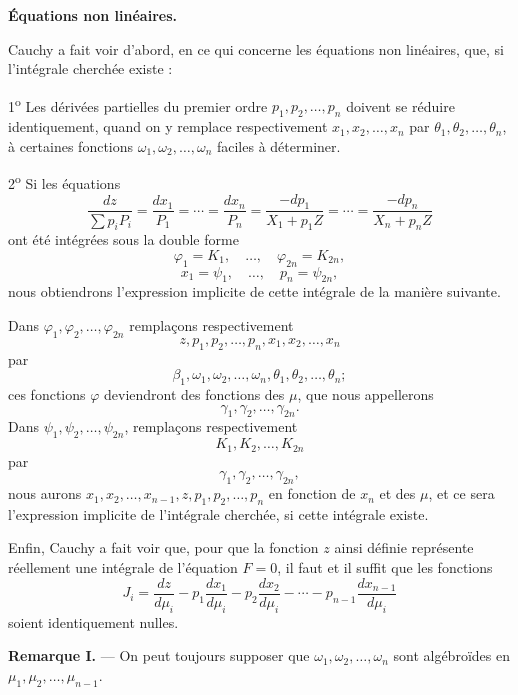 \documentclass[11pt]{article}
\begin{document}
\begin{center}
\textbf{Équations non linéaires.}
\end{center}

Cauchy a fait voir d'abord, en ce qui concerne les équations non linéaires, que, si l'intégrale cherchée existe :

1\textsuperscript{o} Les dérivées partielles du premier ordre $p_1,p_2,\ldots,p_n$ doivent se réduire identiquement, quand on y remplace respectivement $x_1,x_2,\ldots,x_n$ par $\theta_1,\theta_2,\ldots,\theta_n$, à certaines fonctions $\omega_1,\omega_2,\ldots,\omega_n$ faciles à déterminer.

2\textsuperscript{o} Si les équations
\begin{equation*}\tag{4}
\frac{dz}{\sum p_iP_i}=\frac{dx_1}{P_1}=\cdots=\frac{dx_n}{P_n}=\frac{-dp_1}{X_1+p_1Z}=\cdots=\frac{-dp_n}{X_n+p_nZ}
\end{equation*}
ont été intégrées sous la double forme
\begin{equation*}\tag{5}
\varphi_1=K_1,
\quad \ldots,
\quad \varphi_{2n}=K_{2n},
\end{equation*}
\begin{equation*}\tag{6}
x_1=\psi_1,
\quad \ldots,
\quad p_n=\psi_{2n},
\end{equation*}
nous obtiendrons l'expression implicite de cette intégrale de la manière suivante.

Dans $\varphi_1,\varphi_2,\ldots,\varphi_{2n}$ remplaçons respectivement
\[
z,p_1,p_2,\ldots,p_n,x_1,x_2,\ldots,x_n
\]
par
\[
\beta_1,\omega_1,\omega_2,\ldots,\omega_n,\theta_1,\theta_2,\ldots,\theta_n;
\]
ces fonctions $\varphi$ deviendront des fonctions des $\mu$, que nous appellerons
\[
\gamma_1,\gamma_2,\ldots,\gamma_{2n}.
\]
Dans $\psi_1,\psi_2,\ldots,\psi_{2n}$, remplaçons respectivement
\[
K_1,K_2,\ldots,K_{2n}
\]
par
\[
\gamma_1,\gamma_2,\ldots,\gamma_{2n},
\]
nous aurons $x_1,x_2,\ldots,x_{n-1},z,p_1,p_2,\ldots,p_n$ en fonction de $x_n$ et des $\mu$, et ce sera l'expression implicite de l'intégrale cherchée, si cette intégrale existe.

Enfin, Cauchy a fait voir que, pour que la fonction $z$ ainsi définie représente réellement une intégrale de l'équation $F=0$, il faut et il suffit que les fonctions
\[
J_i=\frac{dz}{d\mu_i}-p_1\frac{dx_1}{d\mu_i}-p_2\frac{dx_2}{d\mu_i}-\cdots-p_{n-1}\frac{dx_{n-1}}{d\mu_i}
\]
soient identiquement nulles.

\medskip
\noindent\textbf{Remarque I.} — On peut toujours supposer que $\omega_1,\omega_2,\ldots,\omega_n$ sont algébroïdes en $\mu_1,\mu_2,\ldots,\mu_{n-1}$.
\end{document}
